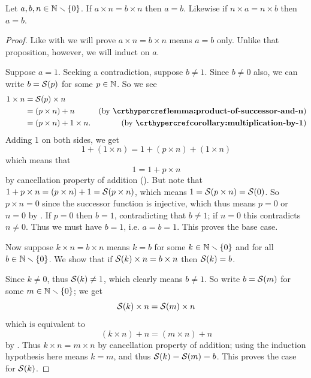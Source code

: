 \begin{proposition}\label{prop:multiplication-cancellation-property}
    Let $a, b, n \in \mathbb{N} \smallsetminus \{0\}$. If $a \times n = b \times n$ then $a = b$. Likewise if $n \times a = n \times b$ then $a = b$.
\end{proposition}
\begin{proof}
    Like with  we will prove $a \times n = b \times n$ means $a = b$ only. Unlike that proposition, however, we will induct on $a$.

    Suppose $a = 1$. Seeking a contradiction, suppose $b \neq 1$. Since $b \neq 0$ also, we can write $b = {\mathcal{S}(p)}$ for some $p \in \mathbb{N}$. So we see
    \begin{align*}
        1 \times n &= \Successor{p} \times n\\
        &= (p \times n) + n & (\text{by \myref{lemma:product-of-successor-and-n}})\\
        &= (p \times n) + 1 \times n. & (\text{by \myref{corollary:multiplication-by-1}})
    \end{align*}
    Adding 1 on both sides, we get
    \[
        1 + (1 \times n) = 1 + (p \times n) + (1 \times n)
    \]
    which means that
    \[
        1 = 1 + p \times n
    \]
    by cancellation property of addition (). But note that $1 + p \times n = (p \times n) + 1 = {\mathcal{S}(p \times n)}$, which means $1 = {\mathcal{S}(p \times n)} = {\mathcal{S}(0)}$. So $p \times n = 0$ since the successor function is injective, which thus means $p = 0$ or $n = 0$ by . If $p = 0$ then $b = 1$, contradicting that $b \neq 1$; if $n = 0$ this contradicts $n \neq 0$. Thus we must have $b = 1$, i.e. $a = b = 1$. This proves the base case.

    Now suppose $k \times n = b \times n$ means $k = b$ for some $k \in \mathbb{N} \smallsetminus \{0\}$ and for all $b \in \mathbb{N} \smallsetminus \{0\}$. We show that if ${\mathcal{S}(k)} \times n = b \times n$ then ${\mathcal{S}(k)} = b$.

    Since $k \neq 0$, thus ${\mathcal{S}(k)} \neq 1$, which clearly means $b \neq 1$. So write $b = {\mathcal{S}(m)}$ for some $m \in \mathbb{N} \smallsetminus \{0\}$; we get
    \[
        {\mathcal{S}(k)} \times n = {\mathcal{S}(m)} \times n
    \]
    which is equivalent to
    \[
        (k \times n) + n = (m \times n) + n
    \]
    by . Thus $k \times n = m \times n$ by cancellation property of addition; using the induction hypothesis here means $k = m$, and thus ${\mathcal{S}(k)} = {\mathcal{S}(m)} = b$. This proves the case for ${\mathcal{S}(k)}$.
\end{proof}

